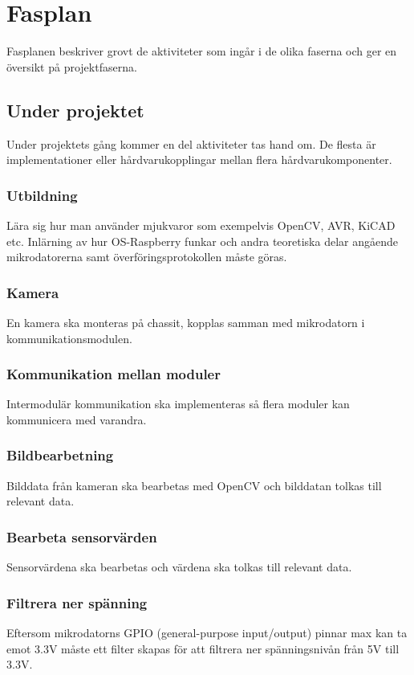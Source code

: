 \documentclass[projektplan/plan.tex]{subfiles}
\begin{document}
\section{Fasplan}
Fasplanen beskriver grovt de aktiviteter som ingår i de olika faserna och ger
en översikt på projektfaserna.

\subsection{Under projektet}
Under projektets gång kommer en del aktiviteter tas hand om. De flesta är
implementationer eller hårdvarukopplingar mellan flera hårdvarukomponenter.

\subsubsection*{Utbildning}
Lära sig hur man använder mjukvaror som exempelvis OpenCV, AVR, KiCAD etc.
Inlärning av hur OS-Raspberry funkar och andra teoretiska delar angående
mikrodatorerna samt överföringsprotokollen måste göras.

\subsubsection*{Kamera}
En kamera ska monteras på chassit, kopplas samman med mikrodatorn i
kommunikationsmodulen.

\subsubsection*{Kommunikation mellan moduler}
Intermodulär kommunikation ska implementeras så flera moduler kan kommunicera
med varandra.

\subsubsection*{Bildbearbetning}
Bilddata från kameran ska bearbetas med OpenCV och bilddatan tolkas till
relevant data.

\subsubsection*{Bearbeta sensorvärden}
Sensorvärdena ska bearbetas och värdena ska tolkas till relevant data.

\subsubsection*{Filtrera ner spänning}
Eftersom mikrodatorns GPIO (general-purpose input/output) pinnar max kan ta
emot 3.3V måste ett filter skapas för att filtrera ner spänningsnivån från 5V
till 3.3V.
\end{document}
